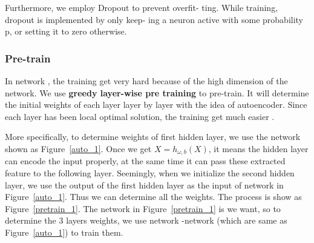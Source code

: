 \documentclass[sigconf]{acmart}
\begin{document}
Furthermore, we employ Dropout \cite{Dropout} to prevent overfit- ting. While training, dropout is implemented by only keep- ing a neuron active with some probability p, or setting it to zero otherwise.

\subsubsection{Pre-train}
In network , the training get very hard because of the high dimension of the network. We use \textbf{greedy layer-wise pre training} to pre-train. It will determine the initial weights of each layer layer by layer with the idea of autoencoder. Since each layer has been local optimal solution, the training get much easier .

More specifically, to determine weights of first hidden layer, we use the network shown as Figure~\ref{auto_1}. Once we get $X=h_{\omega,b}(X)$, it means the hidden layer can encode the input properly, at the same time it can pass these extracted feature to the following layer. Seemingly, when we initialize the second hidden layer, we use the output of the first hidden layer as the input of network in Figure~\ref{auto_1}. Thus we can determine all the weights. The process is show as Figure~\ref{pretrain_1}. The network   in  Figure~\ref{pretrain_1} is we want, so to determine the 3 layers weights, we use network -network  (which are same as  Figure~\ref{auto_1}) to train them.
\end{document}
